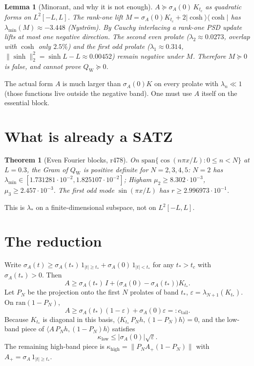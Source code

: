 \documentclass[11pt]{article}
\newtheorem{lemma}{Lemma}
\newtheorem{theorem}{Theorem}
\theoremstyle{remark}
\newcommand{\QW}{Q_{\mathrm W}}
\begin{document}
\begin{lemma}[Minorant, and why it is not enough]\label{lem:M}
$A\succeq\sigma_A(0)\,K_{t_c}$ as quadratic forms on $L^2[-L,L]$.
The rank-one lift $M=\sigma_A(0)K_{t_c}+2|\cosh\rangle\langle\cosh|$
has $\lambda_{\min}(M)\approx-3.448$ (Nystr\"om).
By Cauchy interlacing a rank-one PSD update lifts at most one
negative direction.  The second even prolate
($\lambda_2\approx0.0273$, overlap with $\cosh$ only $2.5\%$)
and the first odd prolate ($\lambda_1\approx0.314$,
$\|\sinh\|_2^2=\sinh L-L\approx0.00452$) remain negative
under $M$.  Therefore $M\succeq0$ is false, and cannot prove
$\QW\succeq0$.
\end{lemma}

The actual form $A$ is much larger than $\sigma_A(0)K$ on
every prolate with $\lambda_n\ll1$ (those functions live
outside the negative band).  One must use $A$ itself on the
essential block.

\section{What is already a SATZ}

\begin{theorem}[Even Fourier blocks, r478]\label{thm:block}
On $\mathrm{span}\{\cos(n\pi x/L):0\le n<N\}$ at $L=0.3$,
the Gram of $\QW$ is positive definite for $N=2,3,4,5$:
$N=2$ has $\lambda_{\min}\in[1.731281\cdot10^{-2},1.825107\cdot10^{-2}]$;
Higham $\mu_2\ge8.302\cdot10^{-3}$, $\mu_3\ge2.457\cdot10^{-3}$.
The first odd mode $\sin(\pi x/L)$ has $r\ge2.996973\cdot10^{-1}$.
\end{theorem}

This is $\lambda_*$ on a finite-dimensional subspace, not on
$L^2[-L,L]$.

\section{The reduction}

Write $\sigma_A(t)\ge\sigma_A(t_*)\,1_{|t|\ge t_*}+\sigma_A(0)\,1_{|t|<t_*}$
for any $t_*>t_c$ with $\sigma_A(t_*)>0$.  Then
\[
 A\ge\sigma_A(t_*)\,I+\bigl(\sigma_A(0)-\sigma_A(t_*)\bigr)K_{t_*}.
\]
Let $P_N$ be the projection onto the first $N$ prolates of
band $t_*$, $\varepsilon=\lambda_{N+1}(K_{t_*})$.
On $\mathrm{ran}(1-P_N)$,
\[
 A\ge\sigma_A(t_*)(1-\varepsilon)+\sigma_A(0)\varepsilon=:c_{\mathrm{tail}}.
\]
Because $K_{t_*}$ is diagonal in this basis,
$\langle K_{t_*}\,P_Nh,(1-P_N)h\rangle=0$, and the low-band
piece of $\langle A\,P_Nh,(1-P_N)h\rangle$ satisfies
\[
 \kappa_{\mathrm{low}}\le\bigl|\sigma_A(0)\bigr|\sqrt{\varepsilon}.
\]
The remaining high-band piece is
$\kappa_{\mathrm{high}}=\bigl\|P_NA_+ (1-P_N)\bigr\|$ with
$A_+=\sigma_A\,1_{|t|\ge t_*}$.
\end{document}
